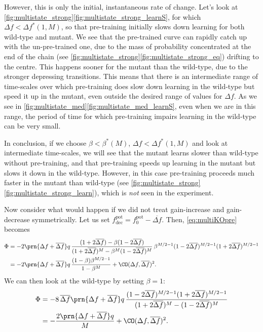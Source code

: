 \documentclass[12pt]{article}
\newcommand{\pot}{^{\text{pot}}}
\newcommand{\norm}{_0}
\newcommand{\dec}{_{\text{dec}}}
\begin{document}
However, this is only the initial, instantaneous rate of change.
Let's look at \autoref{fig:multistate_strong}\ref{fig:multistate_strong_learnS}, for which $\Delta f < \Delta f^*(1,M)$, so that pre-training initially slows down learning for both wild-type and mutant.
We see that the pre-trained curve can rapidly catch up with the un-pre-trained one, due to the mass of probability concentrated at the end of the chain (see \autoref{fig:multistate_strong}\ref{fig:multistate_strong_eq}) drifting to the centre.
This happens sooner for the mutant than the wild-type, due to the stronger depressing transitions.
This means that there is an intermediate range of time-scales over which pre-training does slow down learning in the wild-type but speed it up in the mutant, even outside the desired range of values for $\Delta f$.
As we see in \autoref{fig:multistate_med}\ref{fig:multistate_med_learnS}, even when we are in this range, the period of time for which pre-training impairs learning in the wild-type can be very small.

In conclusion, if we choose $\beta<\beta^*(M)$, $\Delta f < \Delta f^*(1,M)$ and look at intermediate time-scales, we will see that the mutant learns slower than wild-type without pre-training, and that pre-training speeds up learning in the mutant but slows it down in the wild-type.
However, in this case pre-training proceeds much faster in the mutant than wild-type (see \autoref{fig:multistate_strong}\ref{fig:multistate_strong_learn}), which is \emph{not} seen in the experiment.

Now consider what would happen if we did not treat gain-increase and gain-decrease symmetrically.
Let us set $f\pot\dec = f\pot\norm - \overline{\Delta f}$.
Then, \eqref{eq:multiKOpre} becomes
%
\begin{equation}\label{eq:multiKOdiffpre}
\begin{aligned}
  \Phi &= -2\prn{\Delta f + \overline{\Delta f}} q \, \frac{(1+2\overline{\Delta f}) - \beta(1-2\overline{\Delta f})}
          {(1+2\overline{\Delta f})^M - \beta^M(1-2\overline{\Delta f})^M}   \,
          \beta^{M/2-1}(1-2\overline{\Delta f})^{M/2-1} (1+2\overline{\Delta f})^{M/2-1} \\
       &= -2\prn{\Delta f + \overline{\Delta f}} q\,\frac{(1-\beta)\beta^{M/2-1}}{1-\beta^M} + \CO(\Delta f,\overline{\Delta f})^2.
\end{aligned}
\end{equation}
%
We can then look at the wild-type by setting $\beta=1$:
%
\begin{equation}\label{eq:multiWTdiffpre}
\begin{aligned}
  \Phi &= -8\,\overline{\Delta f}\prn{\Delta f + \overline{\Delta f}} q \,
          \frac{(1-2\overline{\Delta f})^{M/2-1} (1+2\overline{\Delta f})^{M/2-1} }
          {(1+2\overline{\Delta f})^M - (1-2\overline{\Delta f})^M}   \\
       &= -\frac{2\prn{\Delta f + \overline{\Delta f}} q}{M} + \CO(\Delta f,\overline{\Delta f})^2.
\end{aligned}
\end{equation}
%
\end{document}
